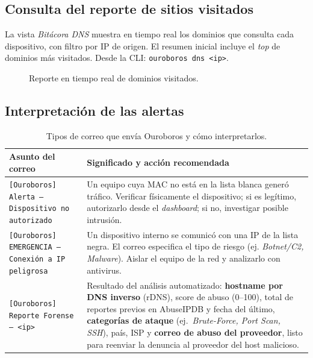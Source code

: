 \documentclass[12pt,letterpaper]{report}
\begin{document}
\subsection{Consulta del reporte de sitios visitados}

La vista \textit{Bitácora DNS} muestra en tiempo real los dominios que
consulta cada dispositivo, con filtro por IP de origen. El resumen inicial
incluye el \textit{top} de dominios más visitados. Desde la CLI:
\texttt{ouroboros dns <ip>}.

\begin{figure}[H]
\centering
{}
\caption{Reporte en tiempo real de dominios visitados.}
\label{fig:dns}
\end{figure}

\subsection{Interpretación de las alertas}

\begin{table}[H]
\centering
\caption{Tipos de correo que envía Ouroboros y cómo interpretarlos.}
\label{tab:alertas}
\begin{tabular}{p{4.6cm}p{9.2cm}}
\toprule
\textbf{Asunto del correo} & \textbf{Significado y acción recomendada} \\
\midrule
\texttt{[Ouroboros] Alerta --- Dispositivo no autorizado} &
Un equipo cuya MAC no está en la lista blanca generó tráfico. Verificar
físicamente el dispositivo; si es legítimo, autorizarlo desde el
\textit{dashboard}; si no, investigar posible intrusión. \\
\midrule
\texttt{[Ouroboros] EMERGENCIA --- Conexión a IP peligrosa} &
Un dispositivo interno se comunicó con una IP de la lista negra. El correo
especifica el tipo de riesgo (ej. \textit{Botnet/C2, Malware}). Aislar el
equipo de la red y analizarlo con antivirus. \\
\midrule
\texttt{[Ouroboros] Reporte Forense --- <ip>} &
Resultado del análisis automatizado: \textbf{hostname por DNS inverso} (rDNS),
score de abuso (0--100), total de reportes previos en AbuseIPDB y fecha del
último, \textbf{categorías de ataque} (ej.\ \textit{Brute-Force, Port Scan,
SSH}), país, ISP y \textbf{correo de abuso del proveedor}, listo para
reenviar la denuncia al proveedor del host malicioso. \\
\bottomrule
\end{tabular}
\end{table}
\end{document}
